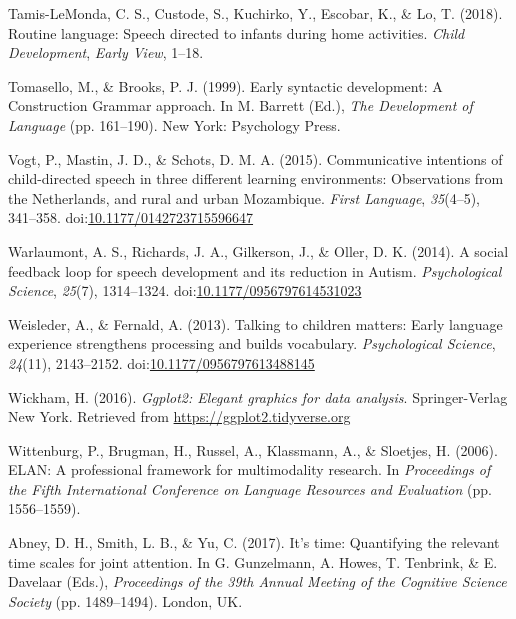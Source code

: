 \documentclass[,man,floatsintext]{apa6}
\begin{document}
\hypertarget{ref-tamislemonda2018routine}{}
Tamis-LeMonda, C. S., Custode, S., Kuchirko, Y., Escobar, K., \& Lo, T.
(2018). Routine language: Speech directed to infants during home
activities. \emph{Child Development}, \emph{Early View}, 1--18.

\hypertarget{ref-tomasello1999early}{}
Tomasello, M., \& Brooks, P. J. (1999). Early syntactic development: A
Construction Grammar approach. In M. Barrett (Ed.), \emph{The
Development of Language} (pp. 161--190). New York: Psychology Press.

\hypertarget{ref-vogt2015communicative}{}
Vogt, P., Mastin, J. D., \& Schots, D. M. A. (2015). Communicative
intentions of child-directed speech in three different learning
environments: Observations from the Netherlands, and rural and urban
Mozambique. \emph{First Language}, \emph{35}(4--5), 341--358.
doi:\href{https://doi.org/10.1177/0142723715596647}{10.1177/0142723715596647}

\hypertarget{ref-warlaumont2014social}{}
Warlaumont, A. S., Richards, J. A., Gilkerson, J., \& Oller, D. K.
(2014). A social feedback loop for speech development and its reduction
in Autism. \emph{Psychological Science}, \emph{25}(7), 1314--1324.
doi:\href{https://doi.org/10.1177/0956797614531023}{10.1177/0956797614531023}

\hypertarget{ref-weisleder2013talking}{}
Weisleder, A., \& Fernald, A. (2013). Talking to children matters: Early
language experience strengthens processing and builds vocabulary.
\emph{Psychological Science}, \emph{24}(11), 2143--2152.
doi:\href{https://doi.org/10.1177/0956797613488145}{10.1177/0956797613488145}

\hypertarget{ref-R-ggplot2}{}
Wickham, H. (2016). \emph{Ggplot2: Elegant graphics for data analysis}.
Springer-Verlag New York. Retrieved from
\url{https://ggplot2.tidyverse.org}

\hypertarget{ref-ELAN}{}
Wittenburg, P., Brugman, H., Russel, A., Klassmann, A., \& Sloetjes, H.
(2006). ELAN: A professional framework for multimodality research. In
\emph{Proceedings of the Fifth International Conference on Language
Resources and Evaluation} (pp. 1556--1559).

\hypertarget{ref-abney2017time}{}
Abney, D. H., Smith, L. B., \& Yu, C. (2017). It's time: Quantifying the
relevant time scales for joint attention. In G. Gunzelmann, A. Howes, T.
Tenbrink, \& E. Davelaar (Eds.), \emph{Proceedings of the 39th Annual
Meeting of the Cognitive Science Society} (pp. 1489--1494). London, UK.
\end{document}
